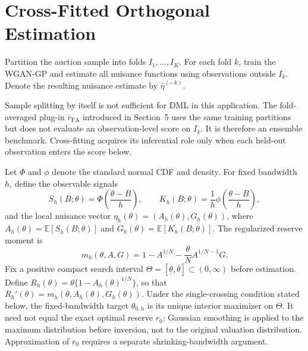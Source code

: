 \section{Cross-Fitted Orthogonal Estimation}

Partition the auction sample into folds $I_1,\ldots,I_K$. For each fold $k$,
train the WGAN-GP and estimate all nuisance functions using observations outside
$I_k$. Denote the resulting nuisance estimate by $\widehat\eta^{(-k)}$.

Sample splitting by itself is not sufficient for DML in this application. The
fold-averaged plug-in $\overline r_{\mathrm{FA}}$ introduced in Section~5 uses
the same training partitions but does not evaluate an observation-level score
on $I_k$. It is therefore an ensemble benchmark. Cross-fitting acquires its
inferential role only when each held-out observation enters the score below.

Let $\Phi$ and $\phi$ denote the standard normal CDF and density. For fixed
bandwidth $h$, define the observable signals
\begin{equation}
S_h(B;\theta)=\Phi\!\left(\frac{\theta-B}{h}\right),
\qquad
K_h(B;\theta)=\frac{1}{h}\phi\!\left(\frac{\theta-B}{h}\right),
\end{equation}
and the local nuisance vector
$\eta_h(\theta)=(A_h(\theta),G_h(\theta))$, where
$A_h(\theta)=\mathbb E[S_h(B;\theta)]$ and
$G_h(\theta)=\mathbb E[K_h(B;\theta)]$. The regularized reserve moment is
\begin{equation}
m_h(\theta,A,G)=1-A^{1/N}-\frac{\theta}{N}A^{1/N-1}G.
\label{eq:regularized-reserve-moment}
\end{equation}
Fix a positive compact search interval
$\Theta=[\underline\theta,\overline\theta]\subset(0,\infty)$ before estimation.
Define $R_h(\theta)=\theta\{1-A_h(\theta)^{1/N}\}$, so that
$R_h'(\theta)=m_h(\theta,A_h(\theta),G_h(\theta))$. Under the single-crossing
condition stated below, the fixed-bandwidth target $\theta_{0,h}$ is its unique
interior maximizer on $\Theta$. It need not equal the exact optimal reserve
$r_0$: Gaussian smoothing is applied to the maximum distribution before
inversion, not to the original valuation distribution. Approximation of $r_0$
requires a separate shrinking-bandwidth argument.

